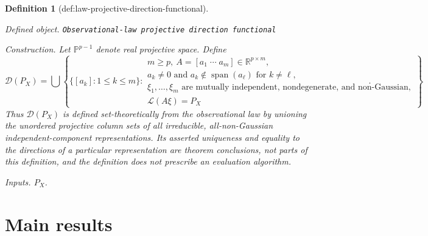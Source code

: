 \documentclass{article}
\newtheorem{definition}{Definition}
\begin{document}
\begin{definition}[def:law-projective-direction-functional]\label{def:law-projective-direction-functional}
\par\smallskip\noindent\emph{Defined object.} \texttt{Observational-\allowbreak{}law projective direction functional}
\par\smallskip\noindent\emph{Construction.} Let \(\mathbb P^{p-1}\) denote real projective space. Define
\[
 \mathcal D(P_X)
 =\bigcup\left\{
   \{[a_k]:1\le k\le m\}:
   \begin{array}{l}
   m\ge p,\ A=[a_1\;\cdots\;a_m]\in\mathbb R^{p\times m},\ \\
   a_k\ne0\text{ and }a_k\notin\operatorname{span}(a_\ell)\text{ for }k\ne\ell,\\
   \xi_1,\ldots,\xi_m\text{ are mutually independent, nondegenerate, and non-Gaussian},\\
   \mathcal L(A\xi)=P_X
   \end{array}
 \right\}.
\]
Thus \(\mathcal D(P_X)\) is defined set-theoretically from the observational law by unioning the unordered projective column sets of all irreducible, all-non-Gaussian independent-component representations. Its asserted uniqueness and equality to the directions of a particular representation are theorem conclusions, not parts of this definition, and the definition does not prescribe an evaluation algorithm.
\par\smallskip\noindent\emph{Inputs.} \(P_X\).
\end{definition}

\section{Main results}
\end{document}
